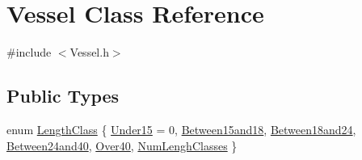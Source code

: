 \hypertarget{class_vessel}{}\section{Vessel Class Reference}
\label{class_vessel}


{\ttfamily \#include $<$Vessel.\+h$>$}

\subsection*{Public Types}
\begin{DoxyCompactItemize}
\item 
enum \mbox{\hyperlink{class_vessel_a9bfc49098702d41533619fa2b2a980bf}{Length\+Class}} \{ \newline
\mbox{\hyperlink{class_vessel_a9bfc49098702d41533619fa2b2a980bfa07af93e52246d1be11422fb5d9d6c6e1}{Under15}} = 0, 
\mbox{\hyperlink{class_vessel_a9bfc49098702d41533619fa2b2a980bfa56fa16a73fbc18113f9b0e6bc7ab8bfa}{Between15and18}}, 
\mbox{\hyperlink{class_vessel_a9bfc49098702d41533619fa2b2a980bfa9770ec29900ebeceafaf56a36de9c740}{Between18and24}}, 
\mbox{\hyperlink{class_vessel_a9bfc49098702d41533619fa2b2a980bfa95c4e237a5d5f7d3bfb764c60a40b9f8}{Between24and40}}, 
\newline
\mbox{\hyperlink{class_vessel_a9bfc49098702d41533619fa2b2a980bfa9832be3e4e9d4a94c292c7b40334b2e6}{Over40}}, 
\mbox{\hyperlink{class_vessel_a9bfc49098702d41533619fa2b2a980bfaca21ad95eacabe8e137cd9851ad63315}{Num\+Lengh\+Classes}}
 \}
\end{DoxyCompactItemize}
